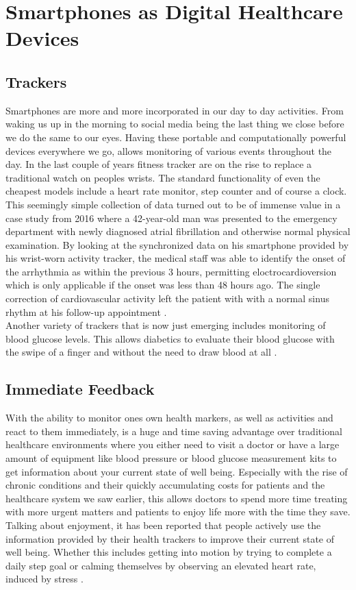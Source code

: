 \section{Smartphones as Digital Healthcare Devices}
\label{sec:smartphoneChances}
\subsection{Trackers}
Smartphones are more and more incorporated in our day to day activities. From waking us up in the morning to social media being the last thing we close before we do the same to our eyes. Having these portable and computationally powerful devices everywhere we go, allows monitoring of various events throughout the day. In the last couple of years fitness tracker are on the rise to replace a traditional watch on peoples wrists. The standard functionality of even the cheapest models include a heart rate monitor, step counter and of course a clock. This seemingly simple collection of data turned out to be of immense value in a case study from 2016 where a 42-year-old man was presented to the emergency department with newly diagnosed atrial fibrillation and otherwise normal physical examination. By looking at the synchronized data on his smartphone provided by his wrist-worn activity tracker, the medical staff was able to identify the onset of the arrhythmia as within the previous 3 hours, permitting eloctrocardioversion which is only applicable if the onset was less than 48 hours ago. The single correction of cardiovascular activity left the patient with with a normal sinus rhythm at his follow-up appointment \cite{rudner2016interrogation}. \\
Another variety of trackers that is now just emerging includes monitoring of blood glucose levels. This allows diabetics to evaluate their blood glucose with the swipe of a finger and without the need to draw blood at all \cite{glucoseTracker}.
\subsection{Immediate Feedback}
With the ability to monitor ones own health markers, as well as activities and react to them immediately, is a huge and time saving advantage over traditional healthcare environments where you either need to visit a doctor or have a large amount of equipment like blood pressure or blood glucose measurement kits to get information about your current state of well being. Especially with the rise of chronic conditions and their quickly accumulating costs for patients and the healthcare system we saw earlier, this allows doctors to spend more time treating with more urgent matters and patients to enjoy life more with the time they save. Talking about enjoyment, it has been reported that people actively use the information provided by their health trackers to improve their current state of well being. Whether this includes getting into motion by trying to complete a daily step goal \cite{rasche2015activity} or calming themselves by observing an elevated heart rate, induced by stress \cite{mayya2015continuous}.
